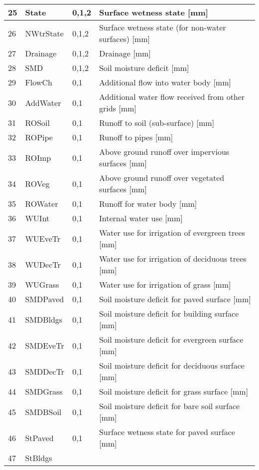 \documentclass[letterpaper,10pt,english]{sphinxmanual}
\begin{document}
\begin{savenotes}
\begin{longtable}{|l|l|l|l|}
\\
\hline
25
&
State
&
0,1,2
&
Surface wetness state {[}mm{]}
\\
\hline
26
&
NWtrState
&
0,1,2
&
Surface wetness state (for non-water surfaces) {[}mm{]}
\\
\hline
27
&
Drainage
&
0,1,2
&
Drainage {[}mm{]}
\\
\hline
28
&
SMD
&
0,1,2
&
Soil moisture deficit {[}mm{]}
\\
\hline
29
&
FlowCh
&
0,1
&
Additional flow into water body {[}mm{]}
\\
\hline
30
&
AddWater
&
0,1
&
Additional water flow received from other grids {[}mm{]}
\\
\hline
31
&
ROSoil
&
0,1
&
Runoff to soil (sub-surface) {[}mm{]}
\\
\hline
32
&
ROPipe
&
0,1
&
Runoff to pipes {[}mm{]}
\\
\hline
33
&
ROImp
&
0,1
&
Above ground runoff over impervious surfaces {[}mm{]}
\\
\hline
34
&
ROVeg
&
0,1
&
Above ground runoff over vegetated surfaces {[}mm{]}
\\
\hline
35
&
ROWater
&
0,1
&
Runoff for water body {[}mm{]}
\\
\hline
36
&
WUInt
&
0,1
&
Internal water use {[}mm{]}
\\
\hline
37
&
WUEveTr
&
0,1
&
Water use for irrigation of evergreen trees {[}mm{]}
\\
\hline
38
&
WUDecTr
&
0,1
&
Water use for irrigation of deciduous trees {[}mm{]}
\\
\hline
39
&
WUGrass
&
0,1
&
Water use for irrigation of grass {[}mm{]}
\\
\hline
40
&
SMDPaved
&
0,1
&
Soil moisture deficit for paved surface {[}mm{]}
\\
\hline
41
&
SMDBldgs
&
0,1
&
Soil moisture deficit for building surface {[}mm{]}
\\
\hline
42
&
SMDEveTr
&
0,1
&
Soil moisture deficit for evergreen surface {[}mm{]}
\\
\hline
43
&
SMDDecTr
&
0,1
&
Soil moisture deficit for deciduous surface {[}mm{]}
\\
\hline
44
&
SMDGrass
&
0,1
&
Soil moisture deficit for grass surface {[}mm{]}
\\
\hline
45
&
SMDBSoil
&
0,1
&
Soil moisture deficit for bare soil surface {[}mm{]}
\\
\hline
46
&
StPaved
&
0,1
&
Surface wetness state for paved surface {[}mm{]}
\\
\hline
47
&
StBldgs
&

\end{longtable}
\end{savenotes}
\end{document}
